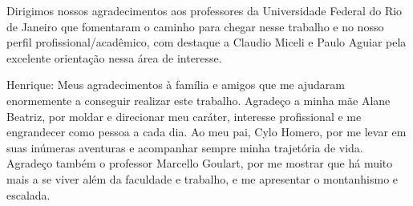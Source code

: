 \begin{agradecimentos}

Dirigimos nossos agradecimentos aos professores da Universidade Federal do Rio de Janeiro que fomentaram o caminho para chegar nesse trabalho e no nosso perfil profissional/acadêmico, com destaque a Claudio Miceli e Paulo Aguiar pela excelente orientação nessa área de interesse.

Henrique: Meus agradecimentos à família e amigos que me ajudaram enormemente a conseguir realizar este trabalho. Agradeço a minha mãe Alane Beatriz, por moldar e direcionar meu caráter, interesse profissional e me engrandecer como pessoa a cada dia. Ao meu pai, Cylo Homero, por me levar em suas inúmeras aventuras e acompanhar sempre minha trajetória de vida. Agradeço também o professor Marcello Goulart, por me mostrar que há muito mais a se viver além da faculdade e trabalho, e me apresentar o montanhismo e escalada.

\end{agradecimentos}